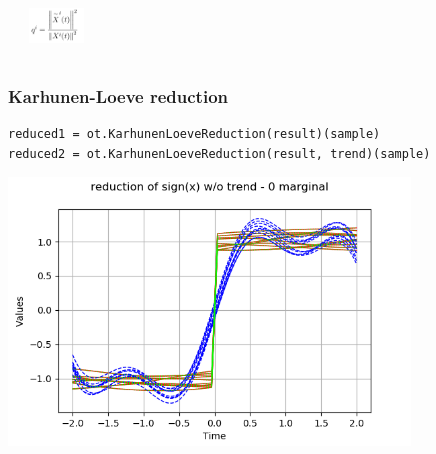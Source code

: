 \documentclass{beamer}
\begin{document}
\begin{frame}[containsverbatim]
\begin{columns}
\begin{center}
\end{center}
\begin{center}
\includegraphics[width=0.4\textwidth]{figures/klqual.png}
\end{center}

\end{columns}
\end{frame}

\begin{frame}[containsverbatim]
\frametitle{Karhunen-Loeve reduction}

\lstset{language=python}

\begin{lstlisting}
reduced1 = ot.KarhunenLoeveReduction(result)(sample)
reduced2 = ot.KarhunenLoeveReduction(result, trend)(sample)
\end{lstlisting}


% 
\begin{center}
\includegraphics[width=0.8\textwidth]{figures/klred.png}
\end{center}

\end{frame}
\end{document}
